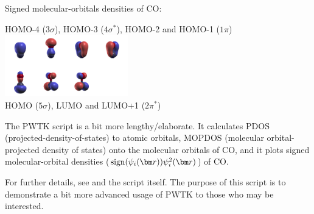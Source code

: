 \documentclass[landscape]{foils}
\begin{document}
Signed molecular-orbitals densities of CO:\\
\begin{center}
HOMO-4 ($3\sigma$), HOMO-3 ($4\sigma^*$), HOMO-2 and HOMO-1 ($1\pi$)\\
  \includegraphics[width=0.4\textwidth]{figs/psi2-montage-CO-Rh100.png}\\
HOMO ($5\sigma$), LUMO and LUMO+1 ($2\pi^*$)
\end{center}

The PWTK script  is a bit more lengthy/elaborate. It
calculates PDOS (projected-density-of-states) to atomic orbitals,
MOPDOS (molecular orbital-projected density of states) onto the
molecular orbitals of CO, and it plots signed molecular-orbital
densities ($\sign(\psi_i(\vr))\psi_i^2(\vr)$) of CO.

For further details, see  and the 
script itself. The purpose of this script is to demonstrate a bit more
advanced usage of PWTK to those who may be interested.
\end{document}
